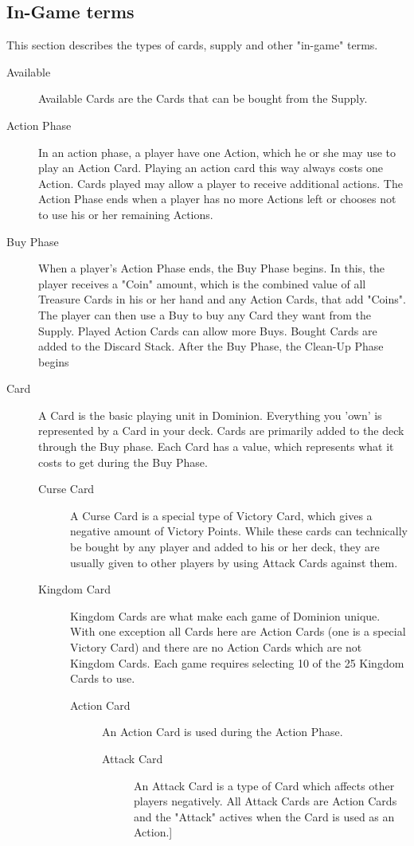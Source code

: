 \documentclass[12pt,a4paper,notitlepage]{article}
\begin{document}
\subsection{In-Game terms}
This section describes the types of cards, supply and other "in-game" terms.
\begin{description}
\item[Available] Available Cards are the Cards that can be bought from the Supply.
\item[Action Phase] In an action phase, a player have one Action, which he or she may use to play an Action Card. Playing an action card this way always costs one Action. Cards played may allow a player to receive additional actions. The Action Phase ends when a player has no more Actions left or chooses not to use his or her remaining Actions. 
\item[Buy Phase] When a player's Action Phase ends, the Buy Phase begins. In this, the player receives a "Coin" amount, which is the combined value of all Treasure Cards in his or her hand and any Action Cards, that add "Coins". The player can then use a Buy to buy any Card they want from the Supply. Played Action Cards can allow more Buys. Bought Cards are added to the Discard Stack. After the Buy Phase, the Clean-Up Phase begins
\item[Card] A Card is the basic playing unit in Dominion. Everything you 'own' is represented by a Card in your deck. Cards are primarily added to the deck through the Buy phase. Each Card has a value, which represents what it costs to get during the Buy Phase.
\begin{description}
\item[Curse Card] A Curse Card is a special type of Victory Card, which gives a negative amount of Victory Points. While these cards can technically be bought by any player and added to his or her deck, they are usually given to other players by using Attack Cards against them.
\item[Kingdom Card] Kingdom Cards are what make each game of Dominion unique. With one exception all Cards here are Action Cards (one is a special Victory Card) and there are no Action Cards which are not Kingdom Cards. Each game requires selecting 10 of the 25 Kingdom Cards to use.
\begin{description}
\item[Action Card] An Action Card is used during the Action Phase.
\begin{description}
\item[Attack Card] An Attack Card is a type of Card which affects other players negatively. All Attack Cards are Action Cards and the "Attack" actives when the Card is used as an Action.]

\end{description}
\end{description}
\end{description}
\end{description}
\end{document}

